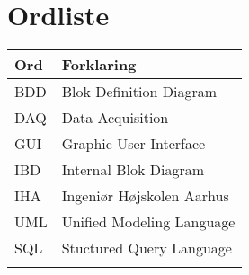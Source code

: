 \chapter{Ordliste}

\begin{longtabu} to 
    Ord &    Forklaring\\
    \toprule 
    BDD & Blok Definition Diagram \\	    
    DAQ & Data Acquisition\\
	GUI & Graphic User Interface\\
	IBD & Internal Blok Diagram\\
	IHA & Ingeniør Højskolen Aarhus\\
	UML & Unified Modeling Language\\
	SQL & Stuctured Query Language\\
	
\label{forkort}
\end{longtabu}
